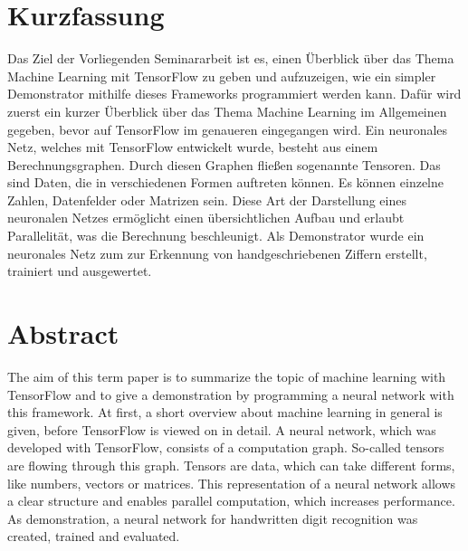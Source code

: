 \section*{Kurzfassung}
Das Ziel der Vorliegenden Seminararbeit ist es, einen Überblick über das Thema Machine Learning mit TensorFlow zu geben und aufzuzeigen, wie ein simpler Demonstrator mithilfe dieses Frameworks programmiert werden kann. Dafür wird zuerst ein kurzer Überblick über das Thema Machine Learning im Allgemeinen gegeben, bevor auf TensorFlow im genaueren eingegangen wird. Ein neuronales Netz, welches mit TensorFlow entwickelt wurde, besteht aus einem Berechnungsgraphen. Durch diesen Graphen fließen sogenannte Tensoren. Das sind Daten, die in verschiedenen Formen auftreten können. Es können einzelne Zahlen, Datenfelder oder Matrizen sein. Diese Art der Darstellung eines neuronalen Netzes ermöglicht einen übersichtlichen Aufbau und erlaubt Parallelität, was die Berechnung beschleunigt. Als Demonstrator wurde ein neuronales Netz zum zur Erkennung von handgeschriebenen Ziffern erstellt, trainiert und ausgewertet.

\section*{Abstract}
The aim of this term paper is to summarize the topic of machine learning with TensorFlow and to give a demonstration by programming a neural network with this framework. At first, a short overview about machine learning in general is given, before TensorFlow is viewed on in detail. A neural network, which was developed with TensorFlow, consists of a computation graph. So-called tensors are flowing through this graph. Tensors are data, which can take different forms, like numbers, vectors or matrices. This representation of a neural network allows a clear structure and enables parallel computation, which increases performance. As demonstration, a neural network for handwritten digit recognition was created, trained and evaluated.
